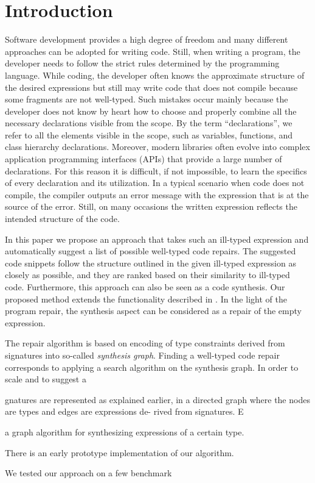 \section{Introduction}
\label{sec:intro}


Software development provides a high degree of freedom and many
different approaches can be adopted for writing code. Still, when
writing a program, the developer needs to follow the strict rules
determined by the programming language. While coding, the developer
often knows the approximate structure of the desired expressions but
still may write code that does not compile because some fragments are
not well-typed. Such mistakes occur mainly because the developer does
not know by heart how to choose and properly combine all the
necessary declarations visible from the scope. By the term
``declarations'', we refer to all the elements visible in the scope,
such as variables, functions, and class hierarchy
declarations. Moreover, modern libraries often evolve into complex
application programming interfaces (APIs) that provide a large number
of declarations. For this reason it is difficult, if not impossible,
to learn the specifics of every declaration and its utilization. In a
typical scenario when code does not compile, the compiler outputs an
error message with the expression that is at the source of the error.
Still, on many occasions the written expression reflects the intended
structure of the code.

In this paper we propose an approach that takes such an ill-typed
expression and automatically suggest a list of possible well-typed
code repairs. The suggested code snippets follow the structure
outlined in the given ill-typed expression as closely as possible, and
they are ranked based on their similarity to ill-typed
code. Furthermore, this approach can also be seen as a code
synthesis. Our proposed method extends the functionality described in
\cite{MandelinetALL2005Jungloid,
  GveroETAL13CompleteCompletionTypesWeights, PerelmanGBG12}. In the
light of the program repair, the synthesis aspect can be considered as
a repair of the empty expression.

The repair algorithm is based on encoding of type constraints derived
from signatures into so-called {\emph {synthesis graph}}. Finding a
well-typed code repair corresponds to applying a search algorithm on the synthesis graph. In order to scale and to suggest a 

gnatures are represented as explained earlier, in a directed
graph where the nodes are types and edges are expressions de-
rived from signatures. E


a graph algorithm for synthesizing expressions of a certain type. 


There is an early prototype implementation of our algorithm.

We tested our approach on a few benchmark 





